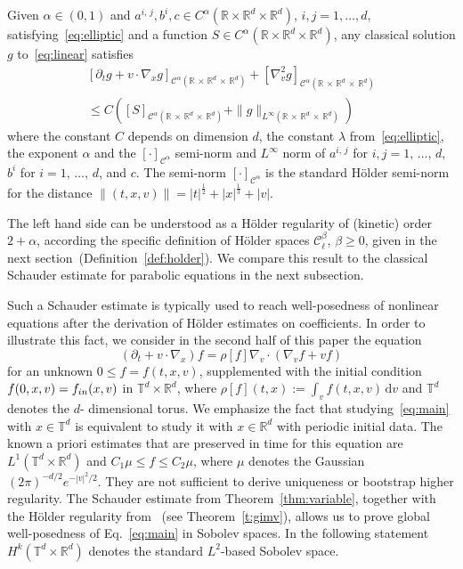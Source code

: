 \documentclass[AHL,Unicode,longabstracts,published]{cedram}
\newcommand{\R}{\mathbb{R}}
\newcommand{\T}{\mathbb{T}}
\newcommand{\cC}{\mathcal{C}}
\newcommand{\dd}{{\, \mathrm d}}
\begin{document}
\begin{theo}\label{thm:variable}
Given $\alpha \in (0,1)$ and $a^{i,\,j},b^i,c \in C^\alpha(\R \times \R^d \times \R^d)$, $i,j=1,\dots,d$, satisfying~\eqref{eq:elliptic} and a function $S \in C^\alpha(\R \times \R^d \times \R^d)$, any classical solution $g$ to~\eqref{eq:linear} satisfies
\begin{multline}\label{eq:schauder-main}
\left[\partial_t g + v \cdot \nabla_x g
\right]_{\cC^\alpha\left(\R\,\times\,\R^d\,\times\,\R^d\right)} + \left[\nabla_v ^2 g
\right]_{\cC^\alpha\left(\R\,\times\,\R^d\,\times\,\R^d\right)}\\
\le C \left([S]_{\cC^\alpha\left(\R\,\times\,\R^d\,\times\,\R^d\right)} +
\|g\|_{L^\infty\left(\R\,\times\,\R^d\,\times\,\R^d\right)}\right)
\end{multline}
where the constant $C$ depends on dimension $d$, the constant $\lambda$ from~\eqref{eq:elliptic}, the exponent $\alpha$ and the $[\cdot]_{\cC^\alpha}$ semi-norm and $L^\infty$ norm of $a^{i,\,j}$ for $i,j=1,\,\dots,\,d$, $b^i$ for $i=1,\,\dots,\,d$, and $c$. The semi-norm $[\cdot]_{\cC^\alpha}$ is the standard H\"older semi-norm for the distance $\|(t,x,v)\|=|t|^{\frac12} + |x|^{\frac13} +|v|$.
\end{theo}

\begin{rema}
The left hand side can be understood as a H\"older regularity of (kinetic) order $2+\alpha$, according the specific definition of H\"older spaces $\cC_\ell^\beta$, $\beta \ge 0$, given in the next section~(Definition~\ref{def:holder}). We compare this result to the classical Schauder estimate for parabolic equations in the next subsection.
\end{rema}

Such a Schauder estimate is typically used to reach well-posedness of nonlinear equations after the derivation of H\"older estimates on coefficients. In order to illustrate this fact, we consider in the second half of this paper the equation
\begin{equation}\label{eq:main}
\left(\partial_t + v \cdot \nabla_x\right) f = \rho[f] \nabla_v \cdot \left(\nabla_v f + v f \right)
\end{equation}
for an unknown $0 \le f =f(t,x,v)$, supplemented with the initial condition $f (0,x,v)\linebreak=f_{in}(x,v)$ in $\T^d \times \R^d$, where $\rho[f] (t,x):= \int_v f(t,x,v) \dd v$ and $\T^d$ denotes the $d$- dimensional torus. We emphasize the fact that studying~\eqref{eq:main} with $x \in \T^d$ is equivalent to study it with $x \in \R^d$ with periodic initial data. The known a priori estimates that are preserved in time for this equation are $L^1(\T^d \times \R^d)$ and $C_1 \mu \le f \le C_2 \mu$, where $\mu$ denotes the Gaussian $(2\pi)^{-d/2} e^{-|v|^2/2}$. They are not sufficient to derive uniqueness or bootstrap higher regularity. The Schauder estimate from Theorem~\ref{thm:variable}, together with the H\"older regularity from~\cite{gimv} (see Theorem~\ref{t:gimv}), allows us to prove global well-posedness of Eq.~\eqref{eq:main} in Sobolev spaces. In the following statement $H^k(\T^d \times \R^d)$ denotes the standard $L^2$-based Sobolev space.
\end{document}
